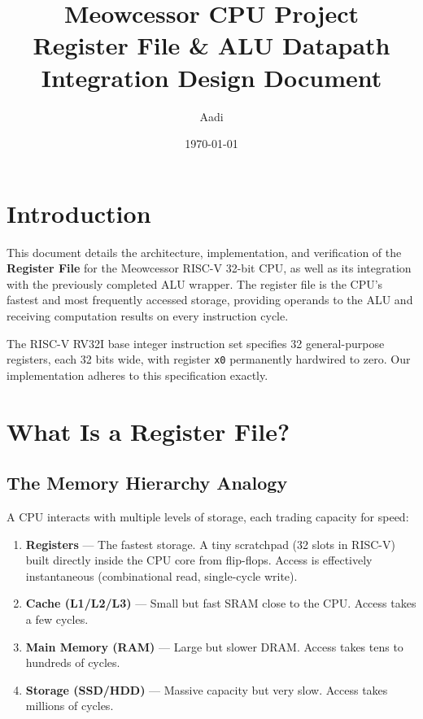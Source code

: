 \documentclass[12pt,a4paper]{article}
\begin{document}
\title{\textbf{Meowcessor CPU Project}\\ \Large Register File \& ALU Datapath Integration Design Document}
\author{Aadi}
\date{\today}
\maketitle

\tableofcontents
\newpage

\section{Introduction}

This document details the architecture, implementation, and verification of the \textbf{Register File} for the Meowcessor RISC-V 32-bit CPU, as well as its integration with the previously completed ALU wrapper. The register file is the CPU's fastest and most frequently accessed storage, providing operands to the ALU and receiving computation results on every instruction cycle.

The RISC-V RV32I base integer instruction set specifies 32 general-purpose registers, each 32 bits wide, with register \texttt{x0} permanently hardwired to zero. Our implementation adheres to this specification exactly.

\section{What Is a Register File?}

\subsection{The Memory Hierarchy Analogy}

A CPU interacts with multiple levels of storage, each trading capacity for speed:

\begin{enumerate}
    \item \textbf{Registers} — The fastest storage. A tiny scratchpad (32 slots in RISC-V) built directly inside the CPU core from flip-flops. Access is effectively instantaneous (combinational read, single-cycle write).
    \item \textbf{Cache (L1/L2/L3)} — Small but fast SRAM close to the CPU. Access takes a few cycles.
    \item \textbf{Main Memory (RAM)} — Large but slower DRAM. Access takes tens to hundreds of cycles.
    \item \textbf{Storage (SSD/HDD)} — Massive capacity but very slow. Access takes millions of cycles.
\end{enumerate}
\end{document}
